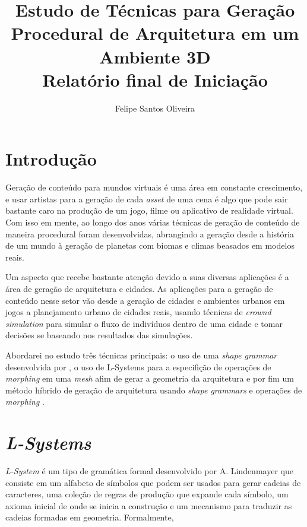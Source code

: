 \documentclass[a4paper, 11pt]{article}
\title{{\huge \bf Estudo de Técnicas para Geração Procedural de Arquitetura em um Ambiente 3D} \\ Relatório final de Iniciação}
\author{Felipe Santos Oliveira}
\begin{document}
    \maketitle
    \newpage
    
    \tableofcontents
    \newpage

    \section{Introdução}
    Geração de conteúdo para mundos virtuais é uma área em constante crescimento, e usar artistas para a geração de cada \textit{asset} de uma cena é algo que pode sair bastante caro na produção de um jogo, filme ou aplicativo de realidade virtual. Com isso em mente, ao longo dos anos várias técnicas de geração de conteúdo de maneira procedural foram desenvolvidas, abrangindo a geração desde a história de um mundo à geração de planetas com biomas e climas beasados em modelos reais. 

    Um aspecto que recebe bastante atenção devido a suas diversas aplicações é a área de geração de arquitetura e cidades. As aplicações para a geração de conteúdo nesse setor vão desde a geração de cidades e ambientes urbanos em jogos a planejamento urbano de cidades reais, usando técnicas de \textit{crownd simulation} para simular o fluxo de indivíduos dentro de uma cidade e tomar decisões se baseando nos resultados das simulações. 

    Abordarei no estudo três técnicas principais: o uso de uma \textit{shape grammar} desenvolvida por \cite{Muller:2006:PMB:1141911.1141931}, o uso de L-Systems para a especifição de operações de \textit{morphing} em uma \textit{mesh} afim de gerar a geometria da arquitetura \cite{Parish:2001:PMC:383259.383292} e por fim um método híbrido de geração de arquitetura usando \textit{shape grammars} e operações de \textit{morphing} \cite{Zawadzki:2013:GSTF}.

    \section{\textit{L-Systems}} \label{sec:lsystem}
    \textit{L-System} é um tipo de gramática formal desenvolvido por A. Lindenmayer \cite{Prusinkiewicz:1996:ABP:235579} que consiste em um alfabeto de símbolos que podem ser usados para gerar cadeias de caracteres, uma coleção de regras de produção que expande cada símbolo, um axioma inicial de onde se inicia a construção e um mecanismo para traduzir as cadeias formadas em geometria. Formalmente,
\end{document}

